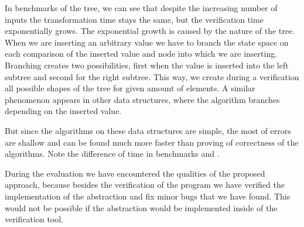 In benchmarks of the \AVL tree, we can see that despite the increasing number of inputs
the transformation time stays the same, but the verification time exponentially
grows. The exponential growth is caused by the nature of the \AVL tree. When we
are inserting an arbitrary value we have to branch the state space on each
comparison of the inserted value and node into which we are inserting. Branching
creates two possibilities, first when the value is inserted into the left
subtree and second for the right subtree. This way, we create during a
verification all possible shapes of the \AVL tree for given amount of elements.
A similar phenomenon appears in other data structures, where the algorithm branches
depending on the inserted value.

But since the algorithms on these data structures are simple, the most of errors
are shallow and can be found much more faster than proving of correctness of
the algorithms. Note the difference of time in benchmarks
 and .

During the evaluation we have encountered the qualities of the proposed
approach, because besides the verification of the program we have verified the
implementation of the abstraction and fix minor bugs that we have found. This
would not be possible if the abstraction would be implemented inside of the
verification tool.
